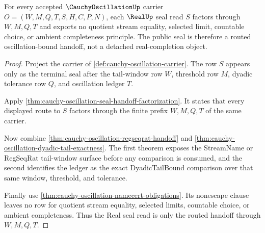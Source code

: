 \begin{theorem}
\label{thm:cauchy-oscillation-real-seal-nonescape}
For every accepted $\CauchyOscillationUp$ carrier $O=(W,M,Q,T,S,H,C,P,N)$, each $\RealUp$ seal read $S$ factors through $W,M,Q,T$ and exports no quotient stream equality, selected limit, countable choice, or ambient completeness principle. The public seal is therefore a routed oscillation-bound handoff, not a detached real-completion object.
\end{theorem}
\begin{proof}
Project the carrier of \autoref{def:cauchy-oscillation-carrier}. The row $S$ appears only as the terminal seal after the tail-window row $W$, threshold row $M$, dyadic tolerance row $Q$, and oscillation ledger $T$.

Apply \autoref{thm:cauchy-oscillation-seal-handoff-factorization}. It states that every displayed route to $S$ factors through the finite prefix $W,M,Q,T$ of the same carrier.

Now combine \autoref{thm:cauchy-oscillation-regseqrat-handoff} and \autoref{thm:cauchy-oscillation-dyadic-tail-exactness}. The first theorem exposes the StreamName or RegSeqRat tail-window surface before any comparison is consumed, and the second identifies the ledger as the exact DyadicTailBound comparison over that same window, threshold, and tolerance.

Finally use \autoref{thm:cauchy-oscillation-namecert-obligations}. Its nonescape clause leaves no row for quotient stream equality, selected limits, countable choice, or ambient completeness. Thus the Real seal read is only the routed handoff through $W,M,Q,T$.
\end{proof}

